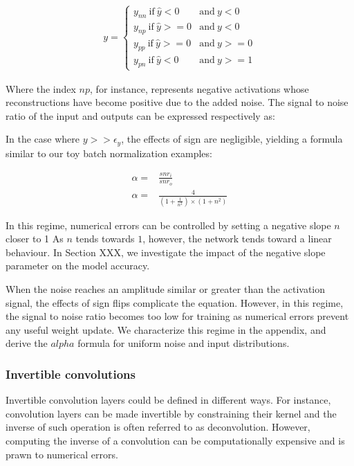 \documentclass[twocolumn]{bmcart}
\begin{document}
\begin{subequations}
\begin{align}
y = \begin{cases}
y_{nn} \  \text{if}\  \hat{y}<0  &\text{and}\  y<0     \\
y_{np} \ \text{if}\  \hat{y}>=0  &\text{and}\  y<0    \\
y_{pp} \  \text{if}\  \hat{y}>=0  &\text{and}\  y>=0 \\
y_{pn} \ \text{if}\  \hat{y}<0     &\text{and}\  y>=1 
\end{cases} 
\end{align}
\end{subequations}

Where the index $np$, for instance, represents negative activations whose reconstructions have become positive due to the added noise. 
The signal to noise ratio of the input and outputs can be expressed respectively as:

In the case where $y >> \epsilon_y$, the effects of sign are negligible, yielding a formula similar to our toy batch normalization examples:

\begin{subequations}
\begin{align}
\alpha =& \frac{snr_i}{snr_o} \\
\alpha =& \frac{4}{(1+\frac{1}{n^2}) \times (1 + n^2)}
\end{align}
\end{subequations}

In this regime, numerical errors can be controlled by setting a negative slope $n$ closer to 1
As $n$ tends towards $1$, however, the network tends toward a linear behaviour. In Section XXX, we investigate the impact of the negative slope parameter on the model accuracy.

When the noise reaches an amplitude similar or greater than the activation signal, the effects of sign flips complicate the equation. However, in this regime, the signal to noise ratio becomes too low for training as numerical errors prevent any useful weight update.
We characterize this regime in the appendix, and derive the $alpha$ formula for uniform noise and input distributions.

\subsubsection{Invertible convolutions}

Invertible convolution layers could be defined in different ways.
For instance, convolution layers can be made invertible by constraining their kernel and the inverse of such operation is often referred to as deconvolution. 
However, computing the inverse of a convolution can be computationally expensive and is  prawn to numerical errors.
\end{document}
